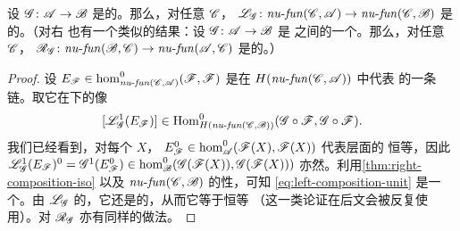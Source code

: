 \begin{lemma}\label{thm:left-composition-cunital}
设 $\mathscr{G}\colon\mathscr{A}\to\mathscr{B}$ 是\trCunital{}的\trAFunctor。那么，对任意%
\trNonunital{}\trACategory{} $\mathscr{C}$，\trComposition\trFunctor{}%
$\mathscr{L}_{\mathscr{G}}\colon\mathit{nu}\text{-}\mathit{fun}(\mathscr{C},\mathscr{A})
\to\mathit{nu}\text{-}\mathit{fun}(\mathscr{C},\mathscr{B})$ 是\trCunital{}的。（对右%
\trComposition{}也有一个类似的结果：设 $\mathscr{G}\colon\mathscr{A}\to\mathscr{B}$ 是%
\trNonunital{}\trACategory{}之间的一个\trNonunital{}\trAFunctor。那么，对任意%
\trCunital{}\trACategory{} $\mathscr{C}$，\trComposition\trFunctor{}%
$\mathscr{R}_{\mathscr{G}}\colon\mathit{nu}\text{-}\mathit{fun}(\mathscr{B},\mathscr{C})
\to\mathit{nu}\text{-}\mathit{fun}(\mathscr{A},\mathscr{C})$ 是\trCunital{}的。）
\end{lemma}
\begin{proof}
设 $E_{\mathscr{F}}\in\hom^0_{\mathit{nu}\text{-}\mathit{fun}(\mathscr{C},\mathscr{A})}
(\mathscr{F},\mathscr{F})$ 是在 $H(\mathit{nu}\text{-}\mathit{fun}(\mathscr{C},\mathscr{A}))$ 中代表%
\trIdentityMorphism{}的一条链。取它在\trComposition{}下的像
\begin{equation}\label{eq:left-composition-unit}
[\mathscr{L}^1_{\mathscr{G}}(E_{\mathscr{F}})]
\in\operatorname{Hom}^0_{H(\mathit{nu}\text{-}\mathit{fun}(\mathscr{C},\mathscr{B}))}
(\mathscr{G}\circ\mathscr{F},\mathscr{G}\circ\mathscr{F}).
\end{equation}
我们已经看到，对每个 $X$，
$E^0_{\mathscr{F}}\in\hom^0_{\mathscr{A}}(\mathscr{F}(X),\mathscr{F}(X))$ 代表\trCohomology{}层面的
恒等，因此
$\mathscr{L}^1_{\mathscr{G}}(E_{\mathscr{F}})^0=\mathscr{G}^1(E^0_{\mathscr{F}})
\in\hom^0_{\mathscr{B}}(\mathscr{G}(\mathscr{F}(X)),\mathscr{G}(\mathscr{F}(X)))$
亦然。利用\cref{thm:right-composition-iso} 以及
$\mathit{nu}\text{-}\mathit{fun}(\mathscr{C},\mathscr{B})$ 的\trCunital{}性，可知
\eqref{eq:left-composition-unit} 是一个\trInvertible{}\trMorphism。由
$\mathscr{L}_{\mathscr{G}}$ 的\trFunctoriality，它还是\trIdempotent{}的，从而它等于恒等
（这一类论证在后文会被反复使用）。对 $\mathscr{R}_{\mathscr{G}}$ 亦有同样的做法。
\end{proof}

